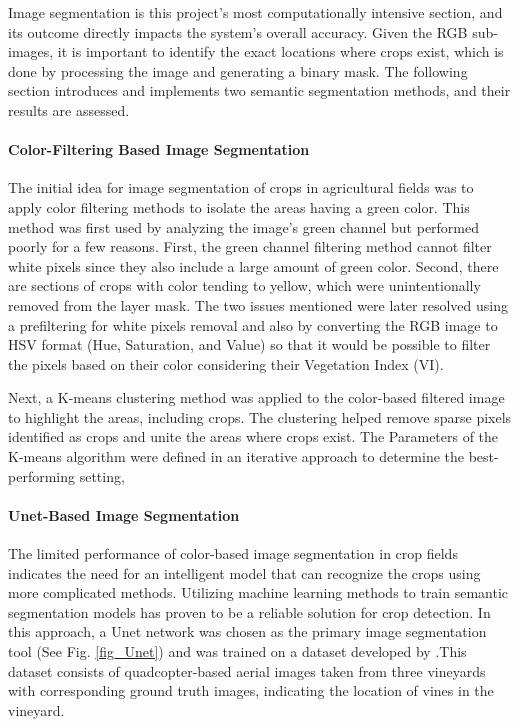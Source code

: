 \documentclass[conference]{IEEEtran}
\begin{document}
	Image segmentation is this project's most computationally intensive section, and its outcome directly impacts the system's overall accuracy. Given the RGB sub-images, it is important to identify the exact locations where crops exist, which is done by processing the image and generating a binary mask. The following section introduces and implements two semantic segmentation methods, and their results are assessed.
	
	\paragraph{Color-Filtering Based Image Segmentation}\leavevmode
	
	The initial idea for image segmentation of crops in agricultural fields was to apply color filtering methods to isolate the areas having a green color. This method was first used by analyzing the image's green channel but performed poorly for a few reasons. First, the green channel filtering method cannot filter white pixels since they also include a large amount of green color. Second, there are sections of crops with color tending to yellow, which were unintentionally removed from the layer mask. The two issues mentioned were later resolved using a prefiltering for white pixels removal and also by converting the RGB image to HSV format (Hue, Saturation, and Value) so that it would be possible to filter the pixels based on their color considering their Vegetation Index (VI).
	
	Next, a K-means clustering method was applied to the color-based filtered image to highlight the areas, including crops. The clustering helped remove sparse pixels identified as crops and unite the areas where crops exist. The Parameters of the K-means algorithm were defined in an iterative approach to determine the best-performing setting,
	
	
	\paragraph{Unet-Based Image Segmentation}\leavevmode
	
	The limited performance of color-based image segmentation in crop fields indicates the need for an intelligent model that can recognize the crops using more complicated methods. Utilizing machine learning methods to train semantic segmentation models has proven to be a reliable solution for crop detection. In this approach, a Unet network was chosen as the primary image segmentation tool (See Fig.
	\ref{fig_Unet})
	and was trained on a dataset developed by
	\cite{b5}
	.This dataset consists of quadcopter-based aerial images taken from three vineyards with corresponding ground truth images, indicating the location of vines in the vineyard.
	
\end{document}
